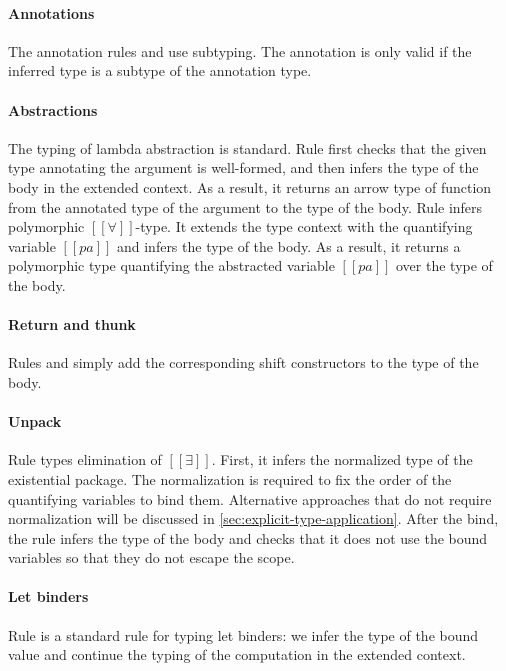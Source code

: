 \paragraph{Annotations}
  The annotation rules 
  and  use subtyping.
  The annotation is only valid if the
  inferred type is a subtype of the annotation type.

\paragraph{Abstractions}
  The typing of lambda abstraction is standard. 
  Rule  first checks
  that the given type annotating the argument is well-formed,
  and then infers the type of the body in the extended context.
  As a result, it returns an arrow type of function from the
  annotated type of the argument to the type of the body.
  Rule  infers polymorphic $[[∀]]$-type. 
  It extends the type context with the quantifying variable $[[pa]]$ and 
  infers the type of the body. As a result, it returns a polymorphic type
  quantifying the abstracted variable $[[pa]]$ over the type of the body.

\paragraph{Return and thunk}
  Rules  
  and 
  simply add the corresponding shift constructors to the type of the body.

\paragraph{Unpack}
  Rule  types elimination of $[[∃]]$.
  First, it infers the normalized type of the existential package.
  The normalization is required to fix the order of the quantifying variables
  to bind them. Alternative approaches that do not require normalization
  will be discussed in \cref{sec:explicit-type-application}.
  After the bind, the rule infers the type of the body 
  and checks that it does not use the bound variables so that they do not 
  escape the scope.

\paragraph{Let binders}
  Rule  is a standard rule for typing let
  binders: we infer the type of the bound value and continue the typing of the
  computation in the extended context.

